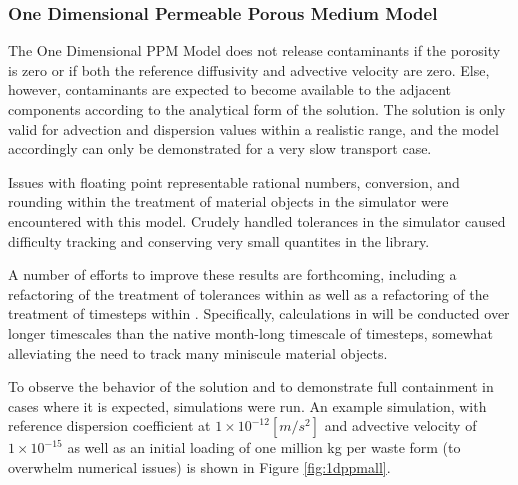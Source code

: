 

\subsubsection{One Dimensional Permeable Porous Medium Model}
The One Dimensional PPM Model does not release contaminants if the porosity is 
zero or if both the reference diffusivity and advective velocity are zero. 
Else, however, contaminants are expected to  become available to the adjacent 
components according to the analytical form of the solution. The solution is 
only valid for advection and dispersion values within a realistic range, and 
the model accordingly can only be demonstrated for a very slow transport case. 

Issues with floating point representable rational numbers, conversion, and 
rounding within the treatment of material objects in the \Cyclus simulator 
were encountered with this model. Crudely handled tolerances in the \Cyclus simulator 
caused difficulty tracking and conserving very small quantites  in the \Cyder 
library.

A number of efforts to improve these results are forthcoming, including a 
refactoring of the treatment of tolerances within \Cyclus as well as a 
refactoring of the treatment of timesteps within \Cyder. Specifically, 
calculations in \Cyder will be conducted over longer timescales than the native 
month-long timescale of \Cyclus timesteps, somewhat alleviating the need to 
track many miniscule material objects. 

To observe the behavior of the solution and to demonstrate full containment in 
cases where it is expected, simulations were run. An example simulation, with 
reference dispersion coefficient at $1\times 10^{-12}[m/s^2]$ and advective 
velocity of $1\times 10^{-15}$ as well as an initial loading of one million kg 
per waste form (to overwhelm numerical issues) is shown in Figure \ref{fig:1dppmall}.  


\FloatBarrier
